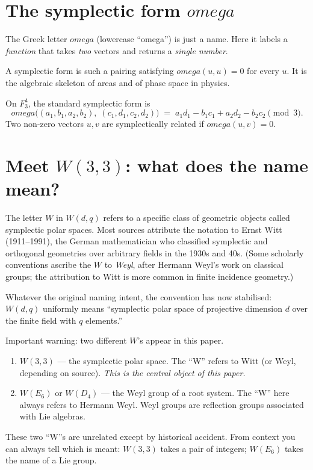 \documentclass[11pt]{article}
\def\mathbb#1{#1}%
\def\textbf#1{#1}%
\def\omega{omega}%
\begin{document}
\section{\texorpdfstring{The symplectic form $\omega$}{The symplectic form omega}}

\begin{mathnote}
The Greek letter $\omega$ (lowercase ``omega'') is just a name. Here it labels a \emph{function} that takes \emph{two} vectors and returns a \emph{single number}.

A \textbf{symplectic form} is such a pairing satisfying $\omega(u, u) = 0$ for every $u$. It is the algebraic skeleton of areas and of phase space in physics.
\end{mathnote}

On $\mathbb{F}_3^4$, the standard symplectic form is
\[
\omega\!\bigl( (a_1, b_1, a_2, b_2),\;(c_1, d_1, c_2, d_2) \bigr) \;=\; a_1 d_1 - b_1 c_1 + a_2 d_2 - b_2 c_2 \pmod{3}.
\]
Two non-zero vectors $u, v$ are \textbf{symplectically related} if $\omega(u, v) = 0$.

\section{\texorpdfstring{Meet $W(3,3)$: what does the name mean?}{Meet W(3,3): what does the name mean?}}

\begin{history}
The letter $W$ in $W(d, q)$ refers to a specific class of geometric objects called \textbf{symplectic polar spaces}. Most sources attribute the notation to \textbf{Ernst Witt} (1911--1991), the German mathematician who classified symplectic and orthogonal geometries over arbitrary fields in the 1930s and 40s. (Some scholarly conventions ascribe the $W$ to \emph{Weyl}, after Hermann Weyl's work on classical groups; the attribution to Witt is more common in finite incidence geometry.)

Whatever the original naming intent, the convention has now stabilised: $W(d, q)$ uniformly means ``symplectic polar space of projective dimension $d$ over the finite field with $q$ elements.''

\smallskip
\textbf{Important warning: two different $W$'s appear in this paper.}
\begin{enumerate}[leftmargin=2em]
\item $W(3, 3)$ --- the symplectic polar space. The ``W'' refers to Witt (or Weyl, depending on source). \emph{This is the central object of this paper.}
\item $W(E_6)$ or $W(D_4)$ --- the \textbf{Weyl group} of a root system. The ``W'' here always refers to Hermann Weyl. Weyl groups are reflection groups associated with Lie algebras.
\end{enumerate}

These two ``W''s are unrelated except by historical accident. From context you can always tell which is meant: $W(3,3)$ takes a pair of integers; $W(E_6)$ takes the name of a Lie group.
\end{history}
\end{document}
